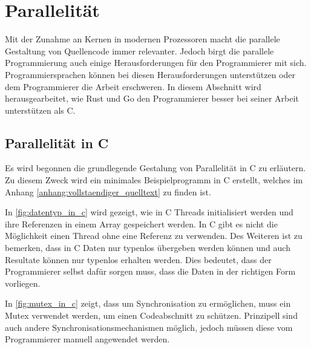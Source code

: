 \section{Parallelität}
\label{sec:Parallelität}

Mit der Zunahme an Kernen in modernen Prozessoren macht die parallele Gestaltung 
von Quellencode immer relevanter. Jedoch birgt die parallele Programmierung
auch einige Herausforderungen für den Programmierer mit sich. Programmiersprachen
können bei diesen Herausforderungen unterstützen oder dem Programmierer die Arbeit
erschweren. In diesem Abschnitt wird herausgearbeitet, wie Rust und Go den
Programmierer besser bei seiner Arbeit unterstützen als C.

\subsection{Parallelität in C}
\label{subsec:Parallelität in C}

Es wird begonnen die grundlegende Gestalung von Parallelität in C zu erläutern.
Zu diesem Zweck wird ein minimales Beispielprogramm in C erstellt, welches im 
Anhang \ref{anhang:vollstaendiger_quelltext} zu finden ist. 

In \cref{fig:datentyp_in_c} wird gezeigt, wie in C Threads initialisiert werden
und ihre Referenzen in einem Array gespeichert werden. In C gibt es nicht die 
Möglichkeit einen Thread ohne eine Referenz zu verwenden. Des Weiteren ist zu 
bemerken, dass in C Daten nur typenlos übergeben werden können und auch Resultate
können nur typenlos erhalten werden. Dies bedeutet, dass der Programmierer
selbst dafür sorgen muss, dass die Daten in der richtigen Form vorliegen. 
\autocite{hawthorneLanguageComparisonParallel}

\begin{figure}[htp]
    \centering
    
\end{figure}

In \cref{fig:mutex_in_c} zeigt, dass um Synchronisation zu ermöglichen, muss
ein Mutex verwendet werden, um einen Codeabschnitt zu schützen. Prinzipell sind 
auch andere Synchronisationsmechanismen möglich, jedoch müssen diese vom 
Programmierer manuell angewendet werden. 

\begin{figure}[htp]
    \centering
    
\end{figure}


